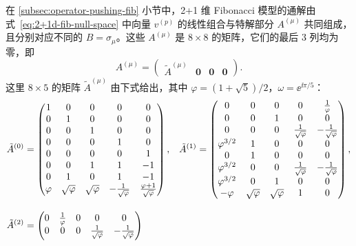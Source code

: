 在 \ref{subsec:operator-pushing-fib} 小节中，2+1 维 Fibonacci 模型的通解由式~\eqref{eq:2+1d-fib-null-space} 中向量 $v^{(p)}$ 的线性组合与特解部分 $A^{(\mu)}$ 共同组成，且分别对应不同的 $B=\sigma_\mu$。这些 $A^{(\mu)}$ 是 $8\times8$ 的矩阵，它们的最后 3 列均为零，即
\begin{equation}
  A^{(\mu)} = \begin{pmatrix}
    \tilde{A}^{(\mu)} & \mathbf{0} & \mathbf{0} & \mathbf{0}
  \end{pmatrix}.
  \label{eq:2+1d-fib-solution-1}
\end{equation}
这里 $8\times5$ 的矩阵 $\tilde{A}^{(\mu)}$ 由下式给出，其中 $\varphi=(1+\sqrt5)/2$，$\omega=\ee^{\ii\pi/5}$：
\begingroup
\small
\allowdisplaybreaks
\begin{align}
  \tilde{A}^{(0)} &= \begin{pmatrix}
    1 & 0 & 0 & 0 & 0 \\
    0 & 1 & 0 & 0 & 0 \\
    0 & 0 & 1 & 0 & 0 \\
    0 & 0 & 0 & 1 & 0 \\
    0 & 0 & 0 & 0 & 1 \\
    0 & 0 & 1 & 1 & -1 \\
    0 & 1 & 0 & 1 & -1 \\
    \varphi & \sqrt{\varphi} & \sqrt{\varphi} & -\frac{1}{\sqrt{\varphi}} & \frac{\varphi+1}{\sqrt{\varphi}} \\
  \end{pmatrix}, &
  \tilde{A}^{(1)} &= \begin{pmatrix}
    0 & 0 & 0 & 0 & \frac{1}{\varphi} \\
    0 & 0 & 1 & 0 & 0 \\
    0 & 0 & 0 & \frac{1}{\sqrt{\varphi}} & -\frac{1}{\sqrt{\varphi}} \\
    \varphi^{3/2} & 1 & 0 & 0 & 0 \\
    0 & 1 & 0 & 0 & 0 \\
    \varphi^{3/2} & 0 & 0 & \frac{1}{\sqrt{\varphi}} & -\frac{1}{\sqrt{\varphi}} \\
    \varphi^{3/2} & 0 & 1 & 0 & 0 \\
    -\varphi & \sqrt{\varphi} & \sqrt{\varphi} & 1 & 0 \\
  \end{pmatrix}, \notag \\[2ex]
  \tilde{A}^{(2)} &= \begin{pmatrix}
    0 & \frac{1}{\varphi} & 0 & 0 & 0 \\
    0 & 0 & 0 & \frac{1}{\sqrt{\varphi}} & -\frac{1}{\sqrt{\varphi}} \\

\end{pmatrix}
\end{align}
